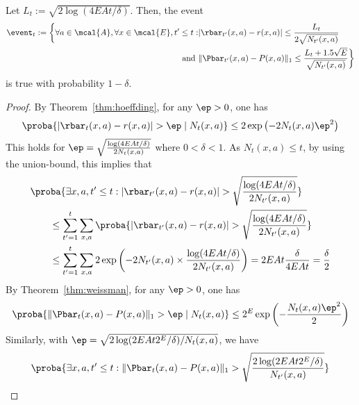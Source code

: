             \begin{lem}
            \label{lem:high_prob_event}
                Let $L_t:=\sqrt{2\log(4EAt/\delta)}$. Then, the event
                \begin{align}
                \event_t:=\bigg\{\forall a\in\mcal{A}, \forall x\in\mcal{E}, t'\le t: &\vert\rbar_{t'}(x,a)-r(x,a)\vert\le \frac{L_t}{2\sqrt{N_{t'}(x,a)}}\\
                \text{ and } &\Vert\Pbar_{t'}(x,a)-P(x,a)\Vert_1\le \frac{L_t+1.5\sqrt{E}}{\sqrt{N_{t'}(x,a)}}\bigg\}
                \end{align}
                is true with probability $1-\delta$.
            \end{lem}
            \begin{proof}
                By Theorem~\ref{thm:hoeffding}, for any $\ep>0$, one has
                \begin{align*}
                \proba{\vert\rbar_{t}(x,a)-r(x,a)\vert>\ep \mid N_{t}(x,a)} \le 2\exp\left(-2N_{t}(x,a)\ep^2\right)
                \end{align*}
                This holds for $\ep=\sqrt{\frac{\log(4EAt/\delta)}{2N_t(x,a)}}$ where $0<\delta<1$.
                As $N_t(x,a)\le t$, by using the union-bound, this implies that
                \begin{align}
                &\proba{\exists x,a, t'\le t: \vert\rbar_{t'}(x,a)-r(x,a)\vert>\sqrt{\frac{\log(4EAt/\delta)}{2N_{t'}(x,a)}}} \label{eq:conc_r}\\
                &\qquad \le \sum_{t'=1}^{t}\sum_{x,a} \proba{\vert\rbar_{t'}(x,a)-r(x,a)\vert>\sqrt{\frac{\log(4EAt/\delta)}{2N_{t'}(x,a)}}} \nonumber \\
                &\qquad \le \sum_{t'=1}^{t}\sum_{x,a} 2\exp\left(-2N_{t'}(x,a)\times\frac{\log(4EAt/\delta)}{2N_{t'}(x,a)}\right) =2EAt \frac{\delta}{4EAt}=\frac{\delta}2 \nonumber
                \end{align}
                By Theorem~\ref{thm:weissman}, for any $\ep>0$, one has
                \begin{align*}
                \proba{\Vert\Pbar_t(x,a)-P(x,a)\Vert_1 > \ep \mid N_t(x,a)} \le 2^E\exp\left(-\frac{N_t(x,a)\ep^2}{2}\right)
                \end{align*}
                Similarly, with $\ep=\sqrt{2\log(2EAt2^E/\delta)/N_t(x,a)}$, we have
                \begin{align*}
                &\proba{\exists x,a, t'\le t: \Vert\Pbar_t(x,a)-P(x,a)\Vert_1 >\sqrt{\frac{2\log(2EAt2^E/\delta)}{N_{t'}(x,a)}}} \\

\end{align*}
\end{proof}
